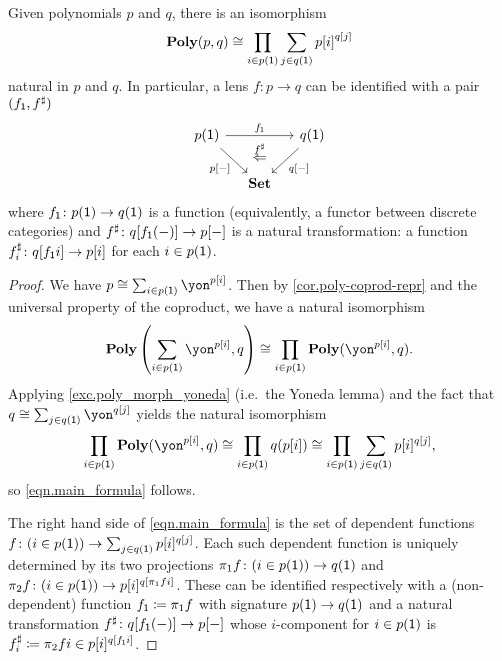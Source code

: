 \documentclass[Book-Poly]{subfiles}
\begin{document}
\begin{proposition}\label{prop.lens-prod-sum}
Given polynomials $p$ and $q$, there is an isomorphism
\begin{equation}\label{eqn.main_formula}
\mathbf{Poly}(p,q)\cong\prod_{i\in p(\textsf{1})}\sum_{j\in q(\textsf{1})}{p[i]}^{q[j]}
\end{equation}
natural in $p$ and $q$.
In particular, a lens $f\colon p\to q$ can be identified with a pair $(f_{\textsf{1}},f^\sharp)$
\begin{equation}\label{eqn.colax_poly_map}
\begin{tikzcd}[column sep=small]
	p(\1)\ar[dr, "p{[-]}"']\ar[rr, "f_\1"]&~&
	q(\1)\ar[dl, "q{[-]}"]\\&
	\smset\ar[u, phantom, near end, "\overset{f^\sharp}{\Leftarrow}"]
\end{tikzcd}
\end{equation}
where $f_{\textsf{1}}\colon p(\textsf{1})\to q(\textsf{1})$ is a function (equivalently, a functor between discrete categories) and $f^\sharp \colon q[f_{\textsf{1}}(-)] \to p[-]$ is a natural transformation: a function $f^\sharp_i\colon q[f_{\textsf{1}}i]\to p[i]$ for each $i\in p(\textsf{1})$.
\end{proposition}
\begin{proof}
We have $p\iso\sum_{i\in p(\1)}\yon^{p[i]}$.
Then by \cref{cor.poly-coprod-repr} and the universal property of the coproduct, we have a natural isomorphism
\[
    \poly\left(\sum_{i\in p(\1)}\yon^{p[i]}, q\right) \iso \prod_{i\in p(\1)}\poly(\yon^{p[i]},q).
\]
Applying \cref{exc.poly_morph_yoneda} (i.e.\ the Yoneda lemma) and the fact that $q\iso\sum_{j\in q(\1)}\yon^{q[j]}$ yields the natural isomorphism
\[
  \prod_{i\in p(\1)}\poly(\yon^{p[i]},q) \iso \prod_{i\in p(\1)}q(p[i]) \iso \prod_{i\in p(\1)}\sum_{j\in q(\1)}p[i]^{q[j]},
\]
so \eqref{eqn.main_formula} follows.


The right hand side of \eqref{eqn.main_formula} is the set of dependent functions $f\colon(i\in p(\textsf{1}))\to\sum_{j\in q(\textsf{1})}p[i]^{q[j]}$.
Each such dependent function is uniquely determined by its two projections $\pi_1f\colon(i\in p(\textsf{1}))\to q(\textsf{1})$ and $\pi_2f\colon(i\in p(\textsf{1}))\to p[i]^{q[\pi_1fi]}$.
These can be identified respectively with a (non-dependent) function $f_{\textsf{1}}\coloneqq\pi_1f$ with signature $p(\textsf{1})\to q(\textsf{1})$ and a natural transformation $f^\sharp\colon q[f_{\textsf{1}}(-)]\to p[-]$ whose $i$-component for $i\in p(\textsf{1})$ is $f^\sharp_i\coloneqq\pi_2 fi\in p[i]^{q[f_{\textsf{1}}i]}$.
\end{proof}
\end{document}

